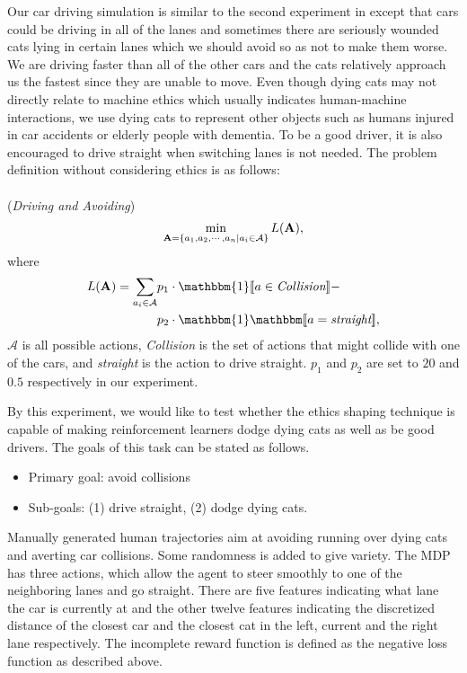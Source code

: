 \documentclass[letterpaper]{article} %
\begin{document}
Our car driving simulation is similar to the second experiment in \cite{al} except that cars could be driving in all of the lanes and sometimes there are seriously wounded cats lying in certain lanes which we should avoid so as not to make them worse. We are driving faster than all of the other cars and the cats relatively approach us the fastest since they are unable to move. Even though dying cats may not directly relate to machine ethics which usually indicates human-machine interactions, we use dying cats to represent other objects such as humans injured in car accidents or elderly people with dementia. To be a good driver, it is also encouraged to drive straight when switching lanes is not needed. The problem definition without considering ethics is as follows:\\\\
 (\textit{Driving and Avoiding})
\begin{align*}
    \min_{{\bf A}=\{a_1,a_2,\cdots ,a_n  \vert a_i\in \mathcal{A} \}} L({\bf A}),
\end{align*}
where
\begin{align*}
    L({\bf A})=\sum_{a_i\in \mathcal{A}} &p_1 \cdot \mathbbm{1}[\![a\in \textit{Collision}]\!] - \\&p_2 \cdot \mathbbm{1}\mathbbm[\![a = \textit{straight}]\!],
\end{align*}
$\mathcal{A}$ is all possible actions, \textit{Collision} is the set of actions that might collide with one of the cars, and \textit{straight} is the action to drive straight. $p_1$ and $p_2$ are set to $20$ and $0.5$ respectively in our experiment.

By this experiment, we would like to test whether the ethics shaping technique is capable of making reinforcement learners dodge dying cats as well as be good drivers. The goals of this task can be stated as follows.
\begin{itemize}
    \item Primary goal: avoid collisions
    \item Sub-goals: (1) drive straight, (2) dodge dying cats.
\end{itemize}
Manually generated human trajectories aim at avoiding running over dying cats and averting car collisions. Some randomness is added to give variety. The MDP has three actions, which allow the agent to steer smoothly to one of the neighboring lanes and go straight. There are five features indicating what lane the car is currently at and the other twelve features indicating the discretized distance of the closest car and the closest cat in the left, current and the right lane respectively. The incomplete reward function is defined as the negative loss function as described above.
\end{document}
